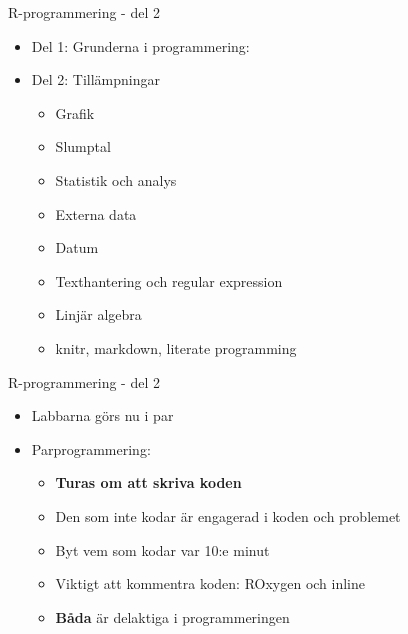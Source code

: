 \documentclass[
  11pt,
  ignorenonframetext,
  handout]{beamer}
\providecommand{\tightlist}{%
  \setlength{\itemsep}{0pt}\setlength{\parskip}{0pt}}
\newcommand\imp[1]{\alert{\textbf{#1}}}
\begin{document}
\begin{frame}{R-programmering - del 2}
\label{r-programmering---del-2-1}
\begin{itemize}
\tightlist
\item
  Del 1: Grunderna i programmering:
\item
  Del 2: Tillämpningar

  \begin{itemize}
  \tightlist
  \item
    Grafik
  \item
    Slumptal
  \item
    Statistik och analys
  \item
    Externa data
  \item
    Datum
  \item
    Texthantering och regular expression
  \item
    Linjär algebra
  \item
    knitr, markdown, literate programming
  \end{itemize}
\end{itemize}
\end{frame}

\begin{frame}{R-programmering - del 2}
\label{r-programmering---del-2-2}
\begin{itemize}
\tightlist
\item
  Labbarna görs nu i par
\item
  Parprogrammering:

  \begin{itemize}
  \item
    \imp{Turas om att skriva koden}
  \item
    Den som inte kodar är engagerad i koden och problemet
  \item
    Byt vem som kodar var 10:e minut
  \item
    Viktigt att kommentra koden: ROxygen och inline
  \item
    \imp{Båda} är delaktiga i programmeringen
  \end{itemize}
\end{itemize}
\end{frame}
\end{document}
